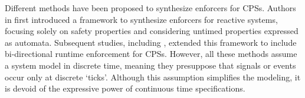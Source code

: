 Different methods have been proposed to synthesize enforcers for CPSs. Authors in \cite{10.1007/978-3-662-46681-0_51} first introduced a framework to synthesize enforcers for reactive systems, focusing solely on safety properties and considering untimed properties expressed as automata. Subsequent studies, including \cite{10.1145/3126500,10.1145/3092282.3092291,10.1109/TII.2019.2945520}, extended this framework to include bi-directional runtime enforcement for CPSs. However, all these methods assume a system model in discrete time, meaning they presuppose that signals or events occur only at discrete `ticks'. Although this assumption simplifies the modeling, it is devoid of the expressive power of continuous time specifications. %



